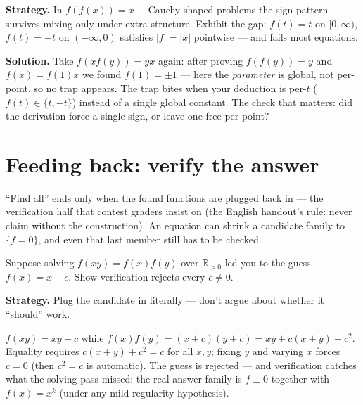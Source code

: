 \begin{example}
\textbf{Strategy.} In $f(f(x))=x$ + Cauchy-shaped problems the sign
pattern survives mixing only under extra structure. Exhibit the gap:
$f(t) = t$ on $[0,\infty)$, $f(t)=-t$ on $(-\infty,0)$ satisfies
$|f|=|x|$ pointwise --- and fails most equations.

\textbf{Solution.} Take $f(x f(y)) = yx$ again: after proving
$f(f(y))=y$ and $f(x)=f(1)x$ we found $f(1)=\pm1$ --- here the
\emph{parameter} is global, not per-point, so no trap appears. The trap
bites when your deduction is per-$t$ ($f(t)\in\{t,-t\}$) instead of a
single global constant. The check that matters: did the derivation force a
single sign, or leave one free per point?
\end{example}

\section{Feeding back: verify the answer}
``Find all'' ends only when the found functions are plugged back in ---
the verification half that contest graders insist on (the English
handout's rule: never claim without the construction). An equation can
shrink a candidate family to $\{f=0\}$, and even that last member still
has to be checked.

\begin{example}
Suppose solving $f(xy)=f(x)f(y)$ over $\mathbb R_{>0}$ led you to the
guess $f(x)=x+c$. Show verification rejects every $c\neq0$.
\par\smallskip
\textbf{Strategy.} Plug the candidate in literally --- don't argue
about whether it ``should'' work.
\par\smallskip
\begin{solution}
$f(xy)=xy+c$ while $f(x)f(y)=(x+c)(y+c)=xy+c(x+y)+c^2$. Equality
requires $c(x+y)+c^2=c$ for all $x,y$; fixing $y$ and varying $x$
forces $c=0$ (then $c^2=c$ is automatic). The guess is rejected ---
and verification catches what the solving pass missed: the real answer
family is $f \equiv 0$ together with $f(x)=x^k$ (under any mild
regularity hypothesis).
\end{solution}
\end{example}

